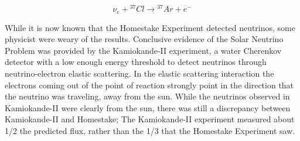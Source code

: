 \begin{equation}
\label{eq:capture}
\nu_{e} +{}^{37}Cl \rightarrow {}^{37}Ar + e^{-}
\end{equation}

While it is now known that the Homestake Experiment detected neutrinos, some physicist were weary of the results. Conclusive evidence of the Solar Neutrino Problem was provided by the Kamiokande-II experiment, a water Cherenkov detector with a low enough energy threshold to detect neutrinos through neutrino-electron elastic scattering. In the elastic scattering interaction the electrons coming out of the point of reaction strongly point in the direction that the neutrino was traveling, away from the sun. While the neutrinos observed in Kamiokande-II were clearly from the sun, there was still a discrepancy between Kamiokande-II and Homestake; The Kamiokande-II experiment measured about 1/2 the predicted flux, rather than the 1/3 that the Homestake Experiment saw.

